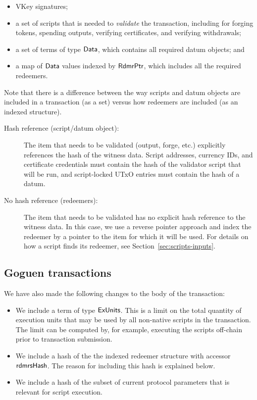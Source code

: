 \begin{itemize}
  \item VKey signatures;
  \item a set of scripts that is needed to \emph{validate} the transaction, including for forging tokens, spending outputs, verifying certificates, and
  verifying withdrawals;
  \item a set of terms of type $\mathsf{Data}$, which contains all required datum objects; and
  \item a map of $\mathsf{Data}$ values indexed by $\mathsf{RdmrPtr}$, which includes all the
  required redeemers.
\end{itemize}

Note that there is a difference between the way scripts and datum objects are included in
a transaction (as a set) versus how redeemers are included
(as an indexed structure). %

\begin{description}
\item
  [Hash reference (script/datum object):]
  The item that needs to be validated (output, forge, etc.) explicitly references the hash of
  the witness data.
  Script addresses, currency IDs, and certificate credentials must contain
  the hash of the validator script that will be run, and script-locked UTxO entries
  must contain the hash of a datum. %

  \item[No hash reference (redeemers):] The item that needs to be validated has no explicit %
  hash reference to the witness data.
  In this case, we use a reverse pointer approach and
  index the redeemer by a pointer to the item for which it will be used.
  For details on how a script finds its redeemer, see Section~\ref{sec:scripts-inputs}.
\end{description}

\subsection{Goguen transactions}
We have also made the following changes to
the body of the transaction:

\begin{itemize}
  \item We include a term of type $\mathsf{ExUnits}$. This is a limit on the total quantity of execution units
  that may be used by all non-native scripts in the transaction.
  The limit can be computed by, for example, executing the scripts off-chain prior to transaction submission.
  \item We include a hash of the the indexed redeemer structure
    with accessor $\mathsf{rdmrsHash}$. The reason for including this hash is explained below.
  \item We include a hash of the subset of current protocol parameters that is relevant for script execution.
\end{itemize}

